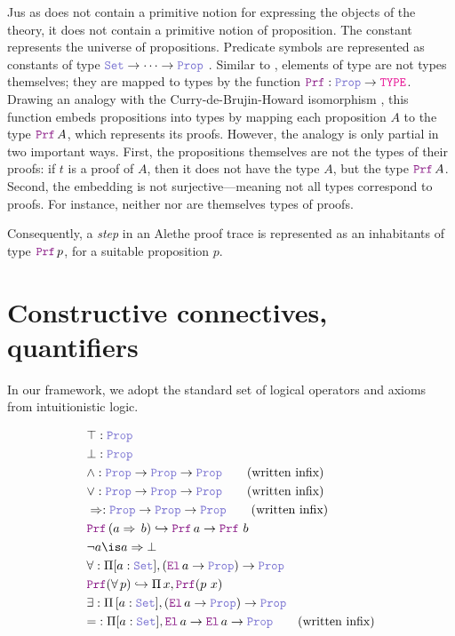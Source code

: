 Jus as \lpm{} does not contain a primitive notion for expressing the objects of the theory, it does not contain a primitive notion of proposition.
The constant \prop{} represents the universe of propositions. Predicate symbols are represented as constants of type $\set{} \ra \dots \ra \prop$ .
Similar to \set{}, elements of type \prop{} are not types themselves; they are mapped to types by the function $\prf{}: \prop \rightarrow \type$.
Drawing an analogy with the Curry-de-Brujin-Howard isomorphism \cite{curryhoward}, this function embeds propositions into types by mapping each proposition $A$ to the type $\prf\,A$, which represents its proofs.
However, the analogy is only partial in two important ways. First, the propositions themselves are not the types of their proofs: if $t$ is a proof of $A$, then it does not have the type $A$,
but the type $\prf\,A$. Second, the embedding is not surjective—meaning not all types correspond to proofs. For instance, neither \set{} nor \prop{} are themselves types of proofs.

Consequently, a \emph{step} in an Alethe proof trace is represented as an inhabitants of type $\prf{}\,p$, for a suitable proposition $p$.

\section{Constructive connectives, quantifiers}
\label{ssec:encoding-prop}

In our framework, we adopt the standard set of logical operators and axioms from intuitionistic logic.

\begin{definition}
\begin{align}
& \top : \prop \\
& \bot : \prop \\
& \land : \prop \ra \prop \ra \prop \qquad \text{(written inﬁx)} \\
& \lor : \prop \ra \prop \ra \prop \qquad \text{(written inﬁx)} \\
& \Rightarrow : \prop \ra \prop \ra \prop \qquad \text{(written inﬁx)} \\
&  \prf\,(a \Rightarrow\,b) \re \prf\, a \ra \prf\,\,b \label{eq:imp}\\
& \neg a \is a \Rightarrow \bot \\
& \forall : \Pi {[a: \set]}, (\el\, a \ra \prop) \ra \prop \label{eq:forall}\\
& \prf{}(\forall\,p) \re \Pi\, x, \prf{(p~x)}\\
& \exists : \Pi\, {[a: \set]}, (\el\, a \ra \prop) \ra \prop \\
& {=} : \Pi [a : \set], \el\, a \ra \el\, a \ra \prop \qquad \text{(written inﬁx)}
\end{align}
\end{definition}

